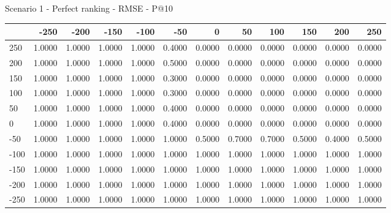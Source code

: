 Scenario 1 - Perfect ranking - RMSE - P@10
\begin{tabular}{lrrrrrrrrrrr}
\toprule
{} &   -250 &   -200 &   -150 &   -100 &   -50  &    0   &    50  &    100 &    150 &    200 &    250 \\
\midrule
 250 & 1.0000 & 1.0000 & 1.0000 & 1.0000 & 0.4000 & 0.0000 & 0.0000 & 0.0000 & 0.0000 & 0.0000 & 0.0000 \\
 200 & 1.0000 & 1.0000 & 1.0000 & 1.0000 & 0.5000 & 0.0000 & 0.0000 & 0.0000 & 0.0000 & 0.0000 & 0.0000 \\
 150 & 1.0000 & 1.0000 & 1.0000 & 1.0000 & 0.3000 & 0.0000 & 0.0000 & 0.0000 & 0.0000 & 0.0000 & 0.0000 \\
 100 & 1.0000 & 1.0000 & 1.0000 & 1.0000 & 0.3000 & 0.0000 & 0.0000 & 0.0000 & 0.0000 & 0.0000 & 0.0000 \\
 50  & 1.0000 & 1.0000 & 1.0000 & 1.0000 & 0.4000 & 0.0000 & 0.0000 & 0.0000 & 0.0000 & 0.0000 & 0.0000 \\
 0   & 1.0000 & 1.0000 & 1.0000 & 1.0000 & 0.4000 & 0.0000 & 0.0000 & 0.0000 & 0.0000 & 0.0000 & 0.0000 \\
-50  & 1.0000 & 1.0000 & 1.0000 & 1.0000 & 1.0000 & 0.5000 & 0.7000 & 0.7000 & 0.5000 & 0.4000 & 0.5000 \\
-100 & 1.0000 & 1.0000 & 1.0000 & 1.0000 & 1.0000 & 1.0000 & 1.0000 & 1.0000 & 1.0000 & 1.0000 & 1.0000 \\
-150 & 1.0000 & 1.0000 & 1.0000 & 1.0000 & 1.0000 & 1.0000 & 1.0000 & 1.0000 & 1.0000 & 1.0000 & 1.0000 \\
-200 & 1.0000 & 1.0000 & 1.0000 & 1.0000 & 1.0000 & 1.0000 & 1.0000 & 1.0000 & 1.0000 & 1.0000 & 1.0000 \\
-250 & 1.0000 & 1.0000 & 1.0000 & 1.0000 & 1.0000 & 1.0000 & 1.0000 & 1.0000 & 1.0000 & 1.0000 & 1.0000 \\
\bottomrule
\end{tabular}

